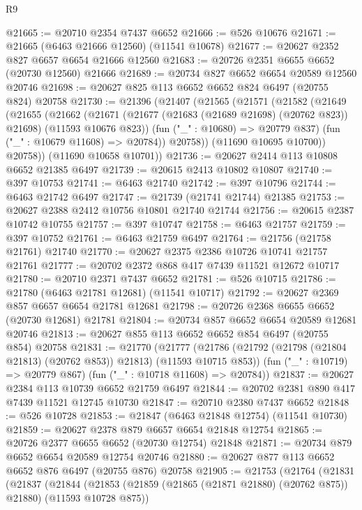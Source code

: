 \begin{lexlean}{R9}
\begin{coremodule}
@21665 := @20710 @2354 @7437 @6652
@21666 := @526 @10676
@21671 := @21665 (@6463 @21666 @12560) (@11541 @10678)
@21677 := @20627 @2352 @827 @6657 @6654 @21666 @12560
@21683 := @20726 @2351 @6655 @6652 (@20730 @12560) @21666
@21689 := @20734 @827 @6652 @6654 @20589 @12560 @20746
@21698 := @20627 @825 @113 @6652 @6652 @824 @6497 (@20755 @824) @20758
@21730 := @21396
    (@21407
      (@21565
        (@21571
          (@21582
            (@21649
              (@21655
                (@21662
                  (@21671
                    (@21677 (@21683 (@21689 @21698) (@20762 @823)) @21698)
                    (@11593 @10676 @823))
                  (fun ("_" : @10680) => @20779 @837)
                  (fun ("_" : @10679 @11608) => @20784))
                @20758))
            (@11690 @10695 @10700))
          @20758))
      (@11690 @10658 @10701))
@21736 := @20627 @2414 @113 @10808 @6652 @21385 @6497
@21739 := @20615 @2413 @10802 @10807
@21740 := @397 @10753
@21741 := @6463 @21740
@21742 := @397 @10796
@21744 := @6463 @21742 @6497
@21747 := @21739 (@21741 @21744) @21385
@21753 := @20627 @2388 @2412 @10756 @10801 @21740 @21744
@21756 := @20615 @2387 @10742 @10755
@21757 := @397 @10747
@21758 := @6463 @21757
@21759 := @397 @10752
@21761 := @6463 @21759 @6497
@21764 := @21756 (@21758 @21761) @21740
@21770 := @20627 @2375 @2386 @10726 @10741 @21757 @21761
@21777 := @20702 @2372 @868 @417 @7439 @11521 @12672 @10717
@21780 := @20710 @2371 @7437 @6652
@21781 := @526 @10715
@21786 := @21780 (@6463 @21781 @12681) (@11541 @10717)
@21792 := @20627 @2369 @857 @6657 @6654 @21781 @12681
@21798 := @20726 @2368 @6655 @6652 (@20730 @12681) @21781
@21804 := @20734 @857 @6652 @6654 @20589 @12681 @20746
@21813 := @20627 @855 @113 @6652 @6652 @854 @6497 (@20755 @854) @20758
@21831 := @21770
    (@21777
      (@21786 (@21792 (@21798 (@21804 @21813) (@20762 @853)) @21813) (@11593 @10715 @853))
      (fun ("_" : @10719) => @20779 @867)
      (fun ("_" : @10718 @11608) => @20784))
@21837 := @20627 @2384 @113 @10739 @6652 @21759 @6497
@21844 := @20702 @2381 @890 @417 @7439 @11521 @12745 @10730
@21847 := @20710 @2380 @7437 @6652
@21848 := @526 @10728
@21853 := @21847 (@6463 @21848 @12754) (@11541 @10730)
@21859 := @20627 @2378 @879 @6657 @6654 @21848 @12754
@21865 := @20726 @2377 @6655 @6652 (@20730 @12754) @21848
@21871 := @20734 @879 @6652 @6654 @20589 @12754 @20746
@21880 := @20627 @877 @113 @6652 @6652 @876 @6497 (@20755 @876) @20758
@21905 := @21753
    (@21764
      (@21831
        (@21837
          (@21844
            (@21853 (@21859 (@21865 (@21871 @21880) (@20762 @875)) @21880) (@11593 @10728 @875))

\end{coremodule}
\end{lexlean}
